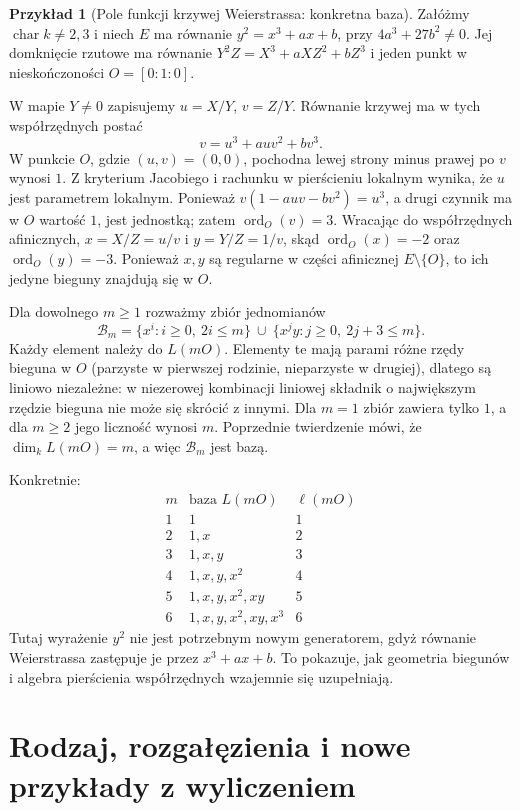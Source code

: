 \documentclass[11pt,a4paper,openany]{report}
\numberwithin{equation}{section}
\theoremstyle{plain}
\theoremstyle{definition}
\newtheorem{przyklad}[twierdzenie]{Przykład}
\theoremstyle{remark}
\begin{document}
\begin{przyklad}[Pole funkcji krzywej Weierstrassa: konkretna baza]
\label{prz:weierstrass-LmO}
Załóżmy $\operatorname{char}k\ne2,3$ i niech $E$ ma równanie
$y^2=x^3+ax+b$, przy $4a^3+27b^2\ne0$.
Jej domknięcie rzutowe ma równanie
$Y^2Z=X^3+aXZ^2+bZ^3$ i jeden punkt
w nieskończoności $O=[0:1:0]$.

W mapie $Y\ne0$ zapisujemy $u=X/Y$, $v=Z/Y$.
Równanie krzywej ma w tych współrzędnych postać
\[
 v=u^3+auv^2+bv^3.
\]
W punkcie $O$, gdzie $(u,v)=(0,0)$,
pochodna lewej strony minus prawej po $v$
wynosi $1$. Z kryterium Jacobiego i rachunku
w pierścieniu lokalnym wynika, że $u$ jest
parametrem lokalnym. Ponieważ
$v(1-auv-bv^2)=u^3$, a drugi czynnik ma w $O$
wartość $1$, jest jednostką; zatem
$\operatorname{ord}_O(v)=3$.
Wracając do współrzędnych afinicznych,
$x=X/Z=u/v$ i $y=Y/Z=1/v$, skąd
$\operatorname{ord}_O(x)=-2$ oraz
$\operatorname{ord}_O(y)=-3$.
Ponieważ $x,y$ są regularne w części afinicznej $E\setminus\{O\}$,
to ich jedyne bieguny znajdują się w $O$.

Dla dowolnego $m\ge1$ rozważmy zbiór jednomianów
\[
 \mathcal B_m=
 \{x^i: i\ge0,\ 2i\le m\}\ \cup\
 \{x^j y:j\ge0,\ 2j+3\le m\}.
\]
Każdy element należy do $L(mO)$. Elementy te mają
parami różne rzędy bieguna w $O$ (parzyste w pierwszej
rodzinie, nieparzyste w drugiej), dlatego są liniowo
niezależne: w niezerowej kombinacji liniowej składnik
o największym rzędzie bieguna nie może się skrócić z innymi.
Dla $m=1$ zbiór zawiera tylko $1$, a dla $m\ge2$
jego liczność wynosi $m$. Poprzednie twierdzenie mówi,
że $\dim_kL(mO)=m$, a więc $\mathcal B_m$ jest bazą.

Konkretnie:
\[
\begin{array}{c|l|c}
 m & \text{baza }L(mO) & \ell(mO)\\ \hline
 1 & 1 & 1\\
 2 & 1,x & 2\\
 3 & 1,x,y & 3\\
 4 & 1,x,y,x^2 & 4\\
 5 & 1,x,y,x^2,xy & 5\\
 6 & 1,x,y,x^2,xy,x^3 & 6
\end{array}
\]
Tutaj wyrażenie $y^2$ nie jest potrzebnym nowym generatorem,
gdyż równanie Weierstrassa zastępuje je przez $x^3+ax+b$.
To pokazuje, jak geometria biegunów i algebra pierścienia
współrzędnych wzajemnie się uzupełniają.
\end{przyklad}

\section{Rodzaj, rozgałęzienia i nowe przykłady z wyliczeniem}
\label{sec:ramification-examples}
\end{document}
